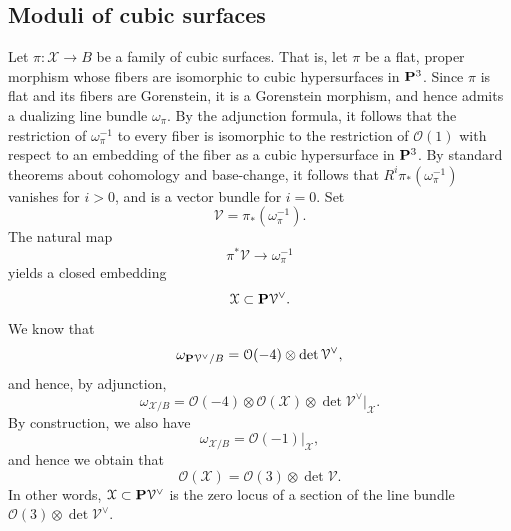 \documentclass[11pt,reqno, letterpaper]{amsart}
\renewcommand{\to}{{\longrightarrow}}
\numberwithin{equation}{section}
\renewcommand{\O}{\mathcal O}
\newcommand{\cX}{\mathcal{X}}
\begin{document}
\subsection{Moduli of cubic surfaces}
\label{sec:classical-facts}
Let $\pi \colon \cX \to B$ be a family of cubic surfaces.  That is,
let $\pi$ be a flat, proper morphism whose fibers are isomorphic to
cubic hypersurfaces in $\P^3$.  Since $\pi$ is flat and its fibers are
Gorenstein, it is a Gorenstein morphism, and hence admits a dualizing
line bundle $\omega_\pi$.  By the adjunction formula, it follows that
the restriction of $\omega_{\pi}^{-1}$ to every fiber is isomorphic to
the restriction of $\O(1)$ with respect to an embedding of the fiber
as a cubic hypersurface in $\P^3$.  By standard theorems about
cohomology and base-change, it follows that
$R^i\pi_* \left(\omega_{\pi}^{-1}\right)$ vanishes for $i > 0$, and is
a vector bundle for $i = 0$.  Set
\[ \mathcal V = \pi_* \left( \omega_\pi^{-1} \right).\]
The natural map 
\[ \pi^*\mathcal V \to \omega_{\pi}^{-1}\]
yields a closed embedding
\begin{equation}\label{eqn:relcanx}
  \cX \subset \P \mathcal V^\vee.
\end{equation}
We know that
\[ \omega_{\P \mathcal V^\vee/B} = \O(-4) \otimes \det \mathcal V^\vee,\]
and hence, by adjunction,
\[ \omega_{\cX/B}= \O(-4) \otimes \O(\cX) \otimes \det \mathcal V^\vee |_\cX.\]
By construction, we also have
\[ \omega_{\cX/B} = \O(-1)|_\cX,\]
and hence we obtain that
\begin{equation}\label{eqn:ox}
  \O(\cX) = \O(3) \otimes \det \mathcal V.
\end{equation}
In other words, $\cX \subset \P \mathcal V^\vee$ is the zero locus of
a section of the line bundle $\O(3) \otimes \det \mathcal V^\vee$.
\end{document}

